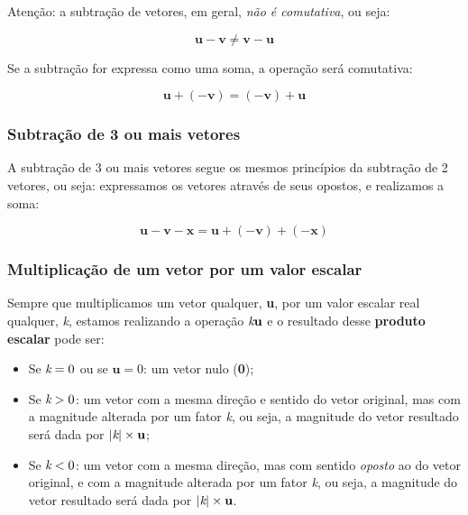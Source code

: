 \documentclass[pdftex, brazil, 12pt, twoside]{article}
\newcommand{\vet}[1]{\textbf{#1}}
\newcommand{\esc}[1]{\emph{#1}}
\begin{document}
Atenção: a subtração de vetores, em geral, \emph{não é comutativa}, ou seja:

\begin{equation}
  \vet{u} - \vet{v} \ne \vet{v} - \vet{u}
\end{equation}

Se a subtração for expressa como uma soma, a operação será comutativa:

\begin{equation}
  \vet{u} + (-\vet{v}) = (-\vet{v}) + \vet{u}
\end{equation}

\subsubsection{Subtração de 3 ou mais vetores}
\label{evd-geom-bi-tri-n-dimen-subtracao-3n}

A subtração de 3 ou mais vetores segue os mesmos princípios da subtração de 2
vetores, ou seja: expressamos os vetores através de seus opostos, e realizamos
a soma:

\begin{equation}
  \vet{u} - \vet{v} - \vet{x} = \vet{u} + (-\vet{v}) + (-\vet{x})
\end{equation}

\subsubsection{Multiplicação de um vetor por um valor escalar}
\label{evd-geom-bi-tri-n-dimen-multiplicacao-escalar}

Sempre que multiplicamos um vetor qualquer, \vet{u}, por um valor escalar
real qualquer, \esc{k}, estamos realizando a operação $\esc{k}\vet{u}$ e
o resultado desse \textbf{produto escalar} pode ser:

\begin{itemize}
\item Se $\esc{k} = 0$ ou se $\vet{u} = 0$: um vetor nulo (\vet{0});
\item Se $\esc{k} > 0$: um vetor com a mesma direção e sentido do vetor original, mas
  com a magnitude alterada por um fator \esc{k}, ou seja, a magnitude do vetor
  resultado será dada por $|\esc{k}| \times \vet{u}$;
\item Se $\esc{k} < 0$: um vetor com a mesma direção, mas com sentido \emph{oposto}
  ao do vetor original, e com a magnitude alterada por um fator \esc{k}, ou seja, a
  magnitude do vetor resultado será dada por $|\esc{k}| \times \vet{u}$.
\end{itemize}
\end{document}
